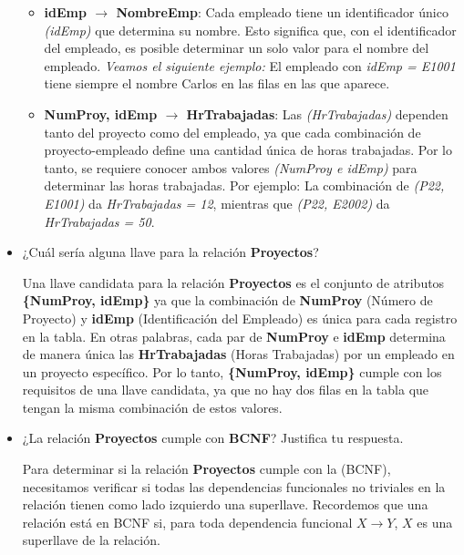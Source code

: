 \begin{itemize}
\begin{itemize}
    \item \textbf{idEmp $\rightarrow$ NombreEmp}: Cada empleado tiene un identificador único \textit{(idEmp)} que determina su nombre. Esto significa que, con el identificador del empleado, es posible determinar un solo valor para el nombre del empleado. \textit{Veamos el siguiente ejemplo:} El empleado con \textit{idEmp = E1001} tiene siempre el nombre Carlos en las filas en las que aparece. \vspace{1cm}
    
    \item \textbf{NumProy, idEmp $\rightarrow$ HrTrabajadas}: Las \textit{(HrTrabajadas)} dependen tanto del proyecto como del empleado, ya que cada combinación de proyecto-empleado define una cantidad única de horas trabajadas. Por lo tanto, se requiere conocer ambos valores \textit{(NumProy e idEmp)} para determinar las horas trabajadas. Por ejemplo: La combinación de \textit{(P22, E1001)} da \textit{HrTrabajadas = 12}, mientras que \textit{(P22, E2002)} da \textit{HrTrabajadas = 50}. \vspace{1cm}
\end{itemize}
\vspace{1cm}
    
    \item ¿Cuál sería alguna llave para la relación \textbf{Proyectos}? \vspace{1cm}
    
    Una llave candidata para la relación \textbf{Proyectos} es el conjunto de atributos \textbf{\{NumProy, idEmp\}} ya que la combinación de \textbf{NumProy} (Número de Proyecto) y \textbf{idEmp} (Identificación del Empleado) es única para cada registro en la tabla. En otras palabras, cada par de \textbf{NumProy} e \textbf{idEmp} determina de manera única las \textbf{HrTrabajadas} (Horas Trabajadas) por un empleado en un proyecto específico. Por lo tanto, \textbf{\{NumProy, idEmp\}} cumple con los requisitos de una llave candidata, ya que no hay dos filas en la tabla que tengan la misma combinación de estos valores. \vspace{1cm}

    \item ¿La relación \textbf{Proyectos} cumple con \textbf{BCNF}? Justifica tu respuesta. \vspace{1cm}
    
    Para determinar si la relación \textbf{Proyectos} cumple con la (BCNF), necesitamos verificar si todas las dependencias funcionales no triviales en la relación tienen como lado izquierdo una superllave. Recordemos que una relación está en BCNF si, para toda dependencia funcional \( X \rightarrow Y \), \( X \) es una superllave de la relación. \vspace{1cm}


\end{itemize}
